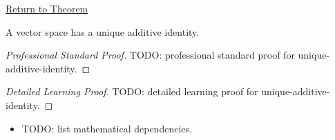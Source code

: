 \newpage
{}
\label{prf:unique-additive-identity}

\begin{remark*}[Return]
\hyperref[thm:unique-additive-identity]{Return to Theorem}
\end{remark*}

\begin{theorem*}
A vector space has a unique additive identity.
\end{theorem*}

\begin{proof}[Professional Standard Proof]
\LRAProofBodyStart
TODO: professional standard proof for unique-additive-identity.
\end{proof}

\begin{proof}[Detailed Learning Proof]
\LRAProofBodyStart
TODO: detailed learning proof for unique-additive-identity.
\end{proof}

\begin{remark*}
\end{remark*}

\begin{dependencies}
\begin{itemize}
  \item TODO: list mathematical dependencies.
\end{itemize}
\end{dependencies}

\clearpage
